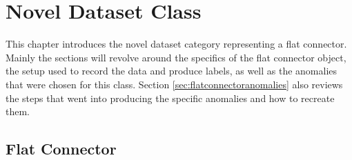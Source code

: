 \chapter{Novel Dataset Class}
\label{chap:datasets}

This chapter introduces the novel dataset category representing a flat connector. Mainly the sections will revolve around the specifics of the flat connector object, the setup used to 
record the data and produce labels, as well as the anomalies that were chosen for this class. Section \ref{sec:flatconnectoranomalies} also reviews the steps that went into producing the specific anomalies 
and how to recreate them.


\section{Flat Connector}
\label{sec:faltconnectordesscription}

